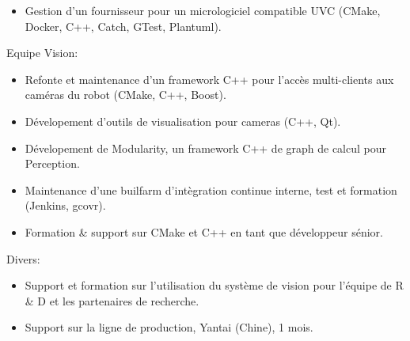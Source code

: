 \documentclass{resume}
\begin{document}
{\begin{itemize}
  	\item Gestion d'un fournisseur pour un micrologiciel compatible UVC (CMake, Docker, C++, Catch, GTest, Plantuml).
  \end{itemize}
  Equipe Vision:\\
  \begin{itemize}
  	\item Refonte et maintenance d'un framework C++ pour l'acc\`{e}s multi-clients aux cam\'{e}ras du robot (CMake, C++, Boost).
  	\item D\'{e}velopement d'outils de visualisation pour cameras (C++, Qt).
  	\item D\'{e}velopement de Modularity, un framework C++ de graph de calcul pour Perception.
  	\item Maintenance d'une builfarm d'int\`{e}gration continue interne, test et formation (Jenkins, gcovr).
  	\item Formation \& support sur CMake et C++ en tant que d\'{e}veloppeur s\'{e}nior.
  \end{itemize}
  Divers:\\
  \begin{itemize}
  	\item Support et formation sur l'utilisation du syst\`{e}me de vision pour l'\'{e}quipe de R \& D et les partenaires de recherche.
  	\item Support sur la ligne de production, Yantai (Chine), 1 mois.
  \end{itemize}
}

\bigskip
\end{document}

